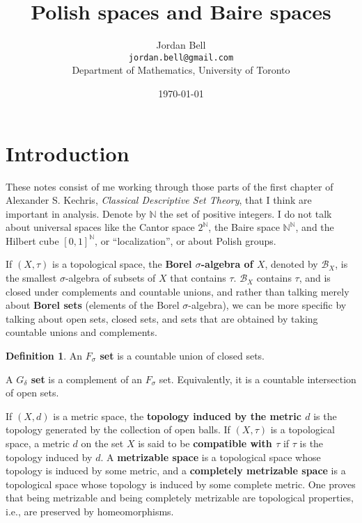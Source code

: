 \documentclass{article}
\theoremstyle{definition}
\newtheorem{definition}[theorem]{Definition}
\begin{document}
\title{Polish spaces and Baire spaces}
\author{Jordan Bell\\ \texttt{jordan.bell@gmail.com}\\Department of Mathematics, University of Toronto}
\date{\today}

\maketitle


\section{Introduction}
These notes consist of me working through those parts of the first chapter of Alexander S. Kechris, {\em Classical Descriptive Set Theory}, 
that I think are important in analysis. Denote by  $\mathbb{N}$ the set of positive integers.
I do not talk about universal spaces like the Cantor space $2^\mathbb{N}$, the Baire space $\mathbb{N}^\mathbb{N}$, and the
Hilbert cube $[0,1]^\mathbb{N}$, or ``localization'', or about Polish groups. 

If $(X,\tau)$ is a topological space, the \textbf{Borel $\sigma$-algebra of $X$},
denoted by $\mathscr{B}_X$, is the smallest $\sigma$-algebra of subsets of $X$ that contains $\tau$. 
$\mathscr{B}_X$ contains $\tau$, and is closed under complements and countable unions, and rather than talking merely about \textbf{Borel sets} (elements of the Borel $\sigma$-algebra),
we can be more specific by talking about open sets, closed sets, and sets that are obtained by taking countable unions and complements. 

\begin{definition}
An \textbf{$F_\sigma$ set}
is a countable union of closed sets.

A \textbf{$G_\delta$ set} is a complement of an $F_\sigma$ set. Equivalently, it is a countable intersection of open sets.
\end{definition}

If $(X,d)$ is a metric space, the \textbf{topology induced by the metric $d$} is the topology generated by the collection of open balls. 
If $(X,\tau)$ is a topological space, a metric $d$ on the set $X$ is said to be \textbf{compatible with $\tau$} if $\tau$ is the topology induced by $d$. A \textbf{metrizable
space} is a topological space whose topology is induced by some metric, and   a \textbf{completely metrizable space} is a topological space whose topology is induced by some
complete metric. One proves that being metrizable  and being completely metrizable are topological properties, i.e., are preserved by homeomorphisms.
\end{document}
